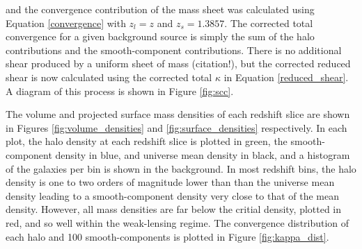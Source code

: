 \documentclass[%
 reprint,
 amsmath,amssymb,
 aps,nofootinbib
]{revtex4-1}
\begin{document}
\noindent and the convergence contribution of the mass sheet was calculated using Equation \eqref{convergence} with ${z_l=z}$ and ${z_s=1.3857}$. The corrected total convergence for a given background source is simply the sum of the halo contributions and the smooth-component contributions. There is no additional shear produced by a uniform sheet of mass (citation!), but the corrected reduced shear is now calculated using the corrected total $\kappa$ in Equation \eqref{reduced_shear}. A diagram of this process is shown in Figure \ref{fig:scc}.

The volume and projected surface mass densities of each redshift slice are shown in Figures \ref{fig:volume_densities} and \ref{fig:surface_densities} respectively. In each plot, the halo density at each redshift slice is plotted in green, the smooth-component density in blue, and universe mean density in black, and a histogram of the galaxies per bin is shown in the background. In most redshift bins, the halo density is one to two orders of magnitude lower than than the universe mean density leading to a smooth-component density very close to that of the mean density. However, all mass densities are far below the critial density, plotted in red, and so well within the weak-lensing regime. The convergence distribution of each halo and 100 smooth-components is plotted in Figure \ref{fig:kappa_dist}.
\end{document}
